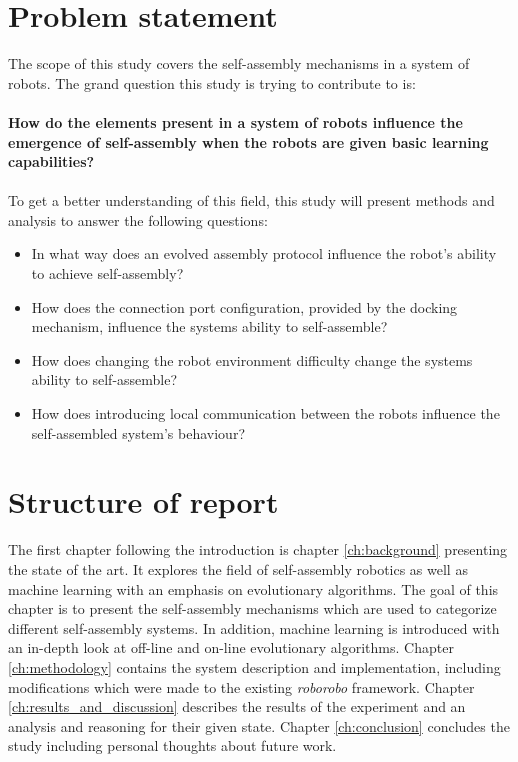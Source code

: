 \section{Problem statement}
The scope of this study covers the self-assembly mechanisms in a system of robots. 
The grand question this study is trying to contribute to is:\\ \\
\textbf{How do the elements present in a system of robots influence the emergence of self-assembly when the robots are given basic learning capabilities?\\ \\}
To get a better understanding of this field, this study will present methods and analysis to answer the following questions:

\begin{itemize}
	
	\item In what way does an evolved assembly protocol influence the robot’s ability to achieve self-assembly?
	
	\item How does the connection port configuration, provided by the docking mechanism, influence the systems ability to self-assemble?
	
	\item How does changing the robot environment difficulty change the systems ability to self-assemble?
	
	\item How does introducing local communication between the robots influence the self-assembled system's behaviour?
	
\end{itemize}

\section{Structure of report}
The first chapter following the introduction is chapter \ref{ch:background} presenting the state of the art. It explores the field of self-assembly robotics as well as machine learning with an emphasis on evolutionary algorithms. The goal of this chapter is to present the self-assembly mechanisms which are used to categorize different self-assembly systems. In addition, machine learning is introduced with an in-depth look at off-line and on-line evolutionary algorithms. Chapter \ref{ch:methodology} contains the system description and implementation, including modifications which were made to the existing \emph{roborobo} framework. Chapter \ref{ch:results_and_discussion} describes the results of the experiment and an analysis and reasoning for their given state.
Chapter \ref{ch:conclusion} concludes the study including personal thoughts about future work.
